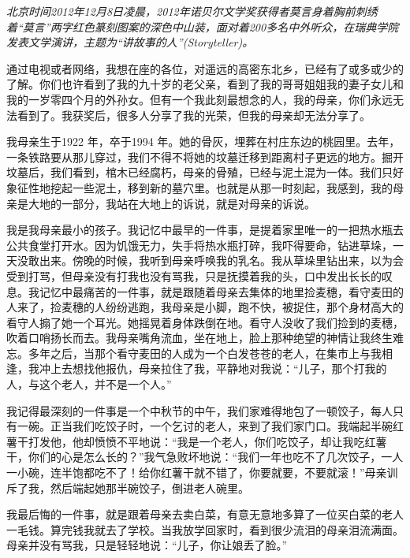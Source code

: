 \documentclass[12pt,a5paper]{ctexbook}
\begin{document}
\emph{北京时间2012年12月8日凌晨，2012年诺贝尔文学奖获得者莫言身着胸前刺绣着“莫言”两字红色篆刻图案的深色中山装，面对着200多名中外听众，在瑞典学院发表文学演讲，主题为“讲故事的人”(Storyteller)。}
\vspace{2em}


通过电视或者网络，我想在座的各位，对遥远的高密东北乡，已经有了或多或少的了解。你们也许看到了我的九十岁的老父亲，看到了我的哥哥姐姐我的妻子女儿和我的一岁零四个月的外孙女。但有一个我此刻最想念的人，我的母亲，你们永远无法看到了。我获奖后，很多人分享了我的光荣，但我的母亲却无法分享了。

我母亲生于1922 年，卒于1994 年。她的骨灰，埋葬在村庄东边的桃园里。去年，一条铁路要从那儿穿过，我们不得不将她的坟墓迁移到距离村子更远的地方。掘开坟墓后，我们看到，棺木已经腐朽，母亲的骨殖，已经与泥土混为一体。我们只好象征性地挖起一些泥土，移到新的墓穴里。也就是从那一时刻起，我感到，我的母亲是大地的一部分，我站在大地上的诉说，就是对母亲的诉说。

我是我母亲最小的孩子。我记忆中最早的一件事，是提着家里唯一的一把热水瓶去公共食堂打开水。因为饥饿无力，失手将热水瓶打碎，我吓得要命，钻进草垛，一天没敢出来。傍晚的时候，我听到母亲呼唤我的乳名。我从草垛里钻出来，以为会受到打骂，但母亲没有打我也没有骂我，只是抚摸着我的头，口中发出长长的叹息。我记忆中最痛苦的一件事，就是跟随着母亲去集体的地里捡麦穗，看守麦田的人来了，捡麦穗的人纷纷逃跑，我母亲是小脚，跑不快，被捉住，那个身材高大的看守人搧了她一个耳光。她摇晃着身体跌倒在地。看守人没收了我们捡到的麦穗，吹着口哨扬长而去。我母亲嘴角流血，坐在地上，脸上那种绝望的神情让我终生难忘。多年之后，当那个看守麦田的人成为一个白发苍苍的老人，在集市上与我相逢，我冲上去想找他报仇，母亲拉住了我，平静地对我说：“儿子，那个打我的人，与这个老人，并不是一个人。”

我记得最深刻的一件事是一个中秋节的中午，我们家难得地包了一顿饺子，每人只有一碗。正当我们吃饺子时，一个乞讨的老人，来到了我们家门口。我端起半碗红薯干打发他，他却愤愤不平地说：“我是一个老人，你们吃饺子，却让我吃红薯干，你们的心是怎么长的？”我气急败坏地说：“我们一年也吃不了几次饺子，一人一小碗，连半饱都吃不了！给你红薯干就不错了，你要就要，不要就滚！”母亲训斥了我，然后端起她那半碗饺子，倒进老人碗里。

我最后悔的一件事，就是跟着母亲去卖白菜，有意无意地多算了一位买白菜的老人一毛钱。算完钱我就去了学校。当我放学回家时，看到很少流泪的母亲泪流满面。母亲并没有骂我，只是轻轻地说：“儿子，你让娘丢了脸。”
\end{document}
